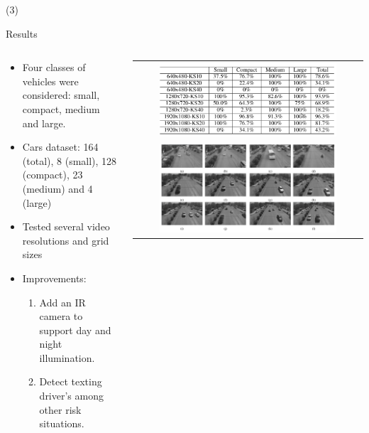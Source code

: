 \begin{frame}{ (3)}
\begin{block}{Results} 
\begin{columns}
\begin{column}{0.5\textwidth}
		\begin{itemize}
		\item Four classes of vehicles were considered: small, compact, medium and large.
		\item Cars dataset: 164 (total), 8 (small), 128 (compact), 23 (medium)
and 4 (large)
         \item Tested several video resolutions and grid sizes
		\item Improvements: 
		\begin{enumerate}
		\item Add an IR camera to support day and night illumination.
        \item Detect texting driver's among other risk situations.
        \end{enumerate}
		\end{itemize}
\end{column}
\begin{column}{0.5\textwidth}  
    \begin{center}
     \begin{tabular}{c}
    \includegraphics[width=0.8\textwidth]{Figs/VehicleClassificationResults}\\
    \includegraphics[width=0.8\textwidth]{Figs/TrafficFlow2}\\
               \end{tabular}
     \end{center}
\end{column}
\end{columns}
\end{block} 
\setcounter{footnote}{0}
\end{frame}

